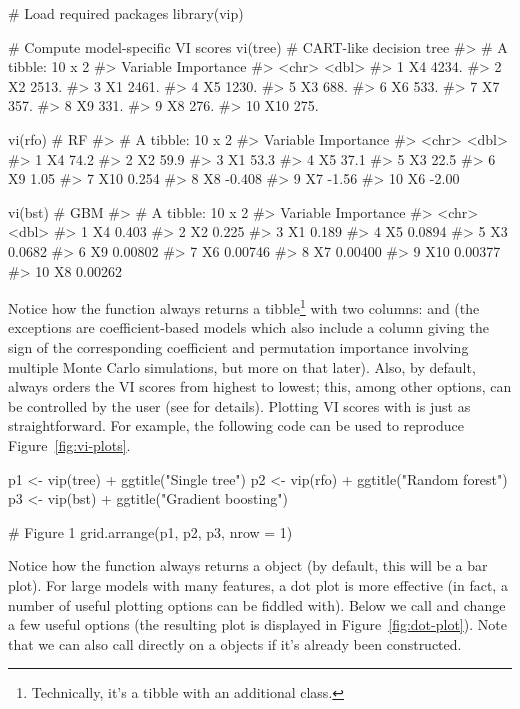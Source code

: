 \begin{example}
# Load required packages
library(vip)

# Compute model-specific VI scores
vi(tree)  # CART-like decision tree
#> # A tibble: 10 x 2
#>    Variable Importance
#>    <chr>         <dbl>
#>  1 X4            4234.
#>  2 X2            2513.
#>  3 X1            2461.
#>  4 X5            1230.
#>  5 X3             688.
#>  6 X6             533.
#>  7 X7             357.
#>  8 X9             331.
#>  9 X8             276.
#> 10 X10            275.

vi(rfo)   # RF
#> # A tibble: 10 x 2
#>    Variable Importance
#>    <chr>         <dbl>
#>  1 X4           74.2  
#>  2 X2           59.9  
#>  3 X1           53.3  
#>  4 X5           37.1  
#>  5 X3           22.5  
#>  6 X9            1.05 
#>  7 X10           0.254
#>  8 X8           -0.408
#>  9 X7           -1.56 
#> 10 X6           -2.00

vi(bst)   # GBM
#> # A tibble: 10 x 2
#>    Variable Importance
#>    <chr>         <dbl>
#>  1 X4          0.403  
#>  2 X2          0.225  
#>  3 X1          0.189  
#>  4 X5          0.0894 
#>  5 X3          0.0682 
#>  6 X9          0.00802
#>  7 X6          0.00746
#>  8 X7          0.00400
#>  9 X10         0.00377
#> 10 X8          0.00262
\end{example}

Notice how the  function always returns a tibble\footnote{Technically, it's a tibble with an additional  class.} with two columns:  and  (the exceptions are coefficient-based models which also include a  column giving the sign of the corresponding coefficient and permutation importance involving multiple Monte Carlo simulations, but more on that later). Also, by default,  always orders the VI scores from highest to lowest; this, among other options, can be controlled by the user (see  for details). Plotting VI scores with  is just as straightforward. For example, the following code can be used to reproduce Figure~\ref{fig:vi-plots}.

\begin{example}
p1 <- vip(tree) + ggtitle("Single tree")
p2 <- vip(rfo) + ggtitle("Random forest")
p3 <- vip(bst) + ggtitle("Gradient boosting")

# Figure 1
grid.arrange(p1, p2, p3, nrow = 1)
\end{example}

Notice how the  function always returns a  object (by default, this will be a bar plot). For large models with many features, a dot plot is more effective (in fact, a number of useful plotting options can be fiddled with). Below we call  and change a few useful options (the resulting plot is displayed in Figure~\ref{fig:dot-plot}). Note that we can also call  directly on a  objects if it's already been constructed.


